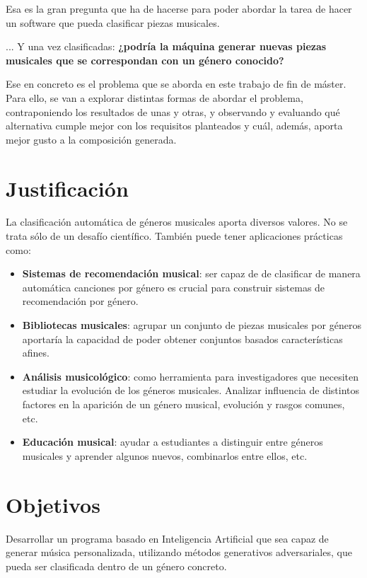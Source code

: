 Esa es la gran pregunta que ha de hacerse para poder abordar la tarea de hacer un software que pueda clasificar piezas musicales.

... Y una vez clasificadas: \textbf{¿podría la máquina generar nuevas piezas musicales que se correspondan con un género conocido?}

Ese en concreto es el problema que se aborda en este trabajo de fin de máster. Para ello, se van a explorar distintas formas de abordar el problema, contraponiendo los resultados de unas y otras, y observando y evaluando qué alternativa cumple mejor con los requisitos planteados y cuál, además, aporta mejor gusto a la composición generada.


\section{Justificación}
La clasificación automática de géneros musicales aporta diversos valores. No se trata sólo de un desafío científico. También puede tener aplicaciones prácticas como:

\begin{itemize}
    \item \textbf{Sistemas de recomendación musical}: ser capaz de de clasificar de manera automática canciones por género es crucial para construir sistemas de recomendación por género.
    \item \textbf{Bibliotecas musicales}: agrupar un conjunto de piezas musicales por géneros aportaría la capacidad de poder obtener conjuntos basados características afines.
    \item \textbf{Análisis musicológico}: como herramienta para investigadores que necesiten estudiar la evolución de los géneros musicales. Analizar influencia de distintos factores en la aparición de un género musical, evolución y rasgos comunes, etc.
    \item \textbf{Educación musical}: ayudar a estudiantes a distinguir entre géneros musicales y aprender algunos nuevos, combinarlos entre ellos, etc.
\end{itemize}

\section{Objetivos}
\label{objetivo-principal}
Desarrollar un programa basado en Inteligencia Artificial que sea capaz de generar música personalizada, utilizando métodos generativos adversariales, que pueda ser clasificada dentro de un género concreto.

